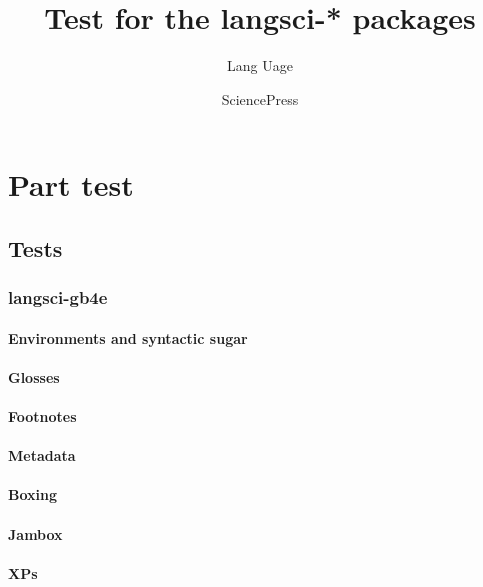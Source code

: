 \documentclass[output=book
  ,nonflat
  ,modfonts,
  ,colorlinks
  ,showindex
  ,draftmode
  ,nobabel
  ,booklanguage=french
  ]{langsci/langscibook}
\title{Test for the langsci-* packages}
\author{Lang Uage\and Science\lastand Press}
\begin{document}
\maketitle 
\tableofcontents
\mainmatter

\part{Part test}
\chapter{Tests} 
\section{langsci-gb4e}
\subsection{Environments and syntactic sugar}










 
\subsection{Glosses}





 
\subsection{Footnotes}


 
\subsection{Metadata}

\subsection{Boxing}
 
\subsection{Jambox}

\subsection{XPs}


  
\end{document}
